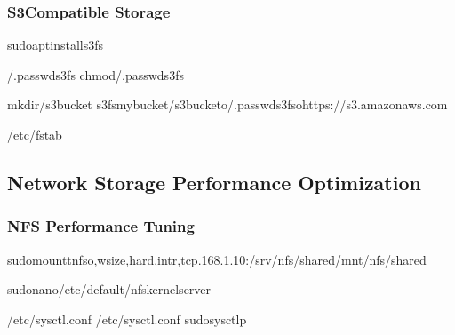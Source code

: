 \documentclass[letterpaper,10pt,english]{sphinxmanual}
\begin{document}
\subsubsection{S3\sphinxhyphen{}Compatible Storage}
\label{\detokenize{network-storage:s3-compatible-storage}}
\begin{sphinxVerbatim}[commandchars=\\\{\}]
sudoaptinstalls3fs

\PYGZgt{}\PYGZti{}/.passwd\PYGZhy{}s3fs
chmod\PYGZti{}/.passwd\PYGZhy{}s3fs

mkdir\PYGZti{}/s3bucket
s3fsmybucket\PYGZti{}/s3bucket\PYGZhy{}o\PYGZti{}/.passwd\PYGZhy{}s3fs\PYGZhy{}ohttps://s3.amazonaws.com

\PYGZgt{}\PYGZgt{}/etc/fstab
\end{sphinxVerbatim}


\subsection{Network Storage Performance Optimization}
\label{\detokenize{network-storage:network-storage-performance-optimization}}

\subsubsection{NFS Performance Tuning}
\label{\detokenize{network-storage:nfs-performance-tuning}}
\begin{sphinxVerbatim}[commandchars=\\\{\}]
sudomount\PYGZhy{}tnfs\PYGZhy{}o,wsize,hard,intr,tcp.168.1.10:/srv/nfs/shared/mnt/nfs/shared

sudonano/etc/default/nfs\PYGZhy{}kernel\PYGZhy{}server

\PYGZgt{}\PYGZgt{}/etc/sysctl.conf
\PYGZgt{}\PYGZgt{}/etc/sysctl.conf
sudosysctl\PYGZhy{}p
\end{sphinxVerbatim}
\end{document}
